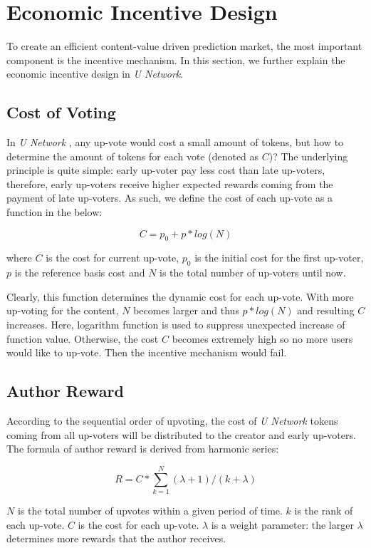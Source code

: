 \section{Economic Incentive Design}
To create an efficient content-value driven prediction market, the most important component is the incentive mechanism. In this section, we further explain the economic incentive design in \emph{U Network}.

\subsection{Cost of Voting}
In \emph{U Network} , any up-vote would cost a small amount of tokens, but how to determine the amount of tokens for each vote (denoted as $C$)? The underlying principle is quite simple: early up-voter pay less cost than late up-voters, therefore, early up-voters receive higher expected rewards coming from the payment of late up-voters. As such, we define the cost of each up-vote as a function in the below:
 \begin{center}
$$C = p_0 + p * log(N)$$
\end{center}
where $C$ is the cost for current up-vote, $p_0$ is the initial cost for the first up-voter, $p$ is the reference basis cost and $N$ is the total number of up-voters until now. 

Clearly, this function determines the dynamic cost for each up-vote.  With more up-voting for the content, $N$ becomes larger and thus $p * log(N)$ and resulting $C$ increases.  Here, logarithm function is used to suppress unexpected increase of function value. Otherwise, the cost $C$ becomes extremely high so no more users would like to up-vote. Then the incentive mechanism would fail.

\subsection{Author Reward}
According to the sequential order of upvoting, the cost of \emph{U Network} tokens coming from all up-voters will be distributed to the creator and early up-voters. The formula of author reward is derived from harmonic series: 
\begin{center}
$$R = C * \sum_{k=1}^{N}  (\lambda + 1)/{(k + \lambda)}$$
\end{center}
$N$ is the total number of upvotes within a given period of time. $k$ is the rank of each up-vote. $C$ is the cost for each up-vote. $\lambda$ is a weight parameter: the larger $\lambda$ determines more rewards that the author receives. 

